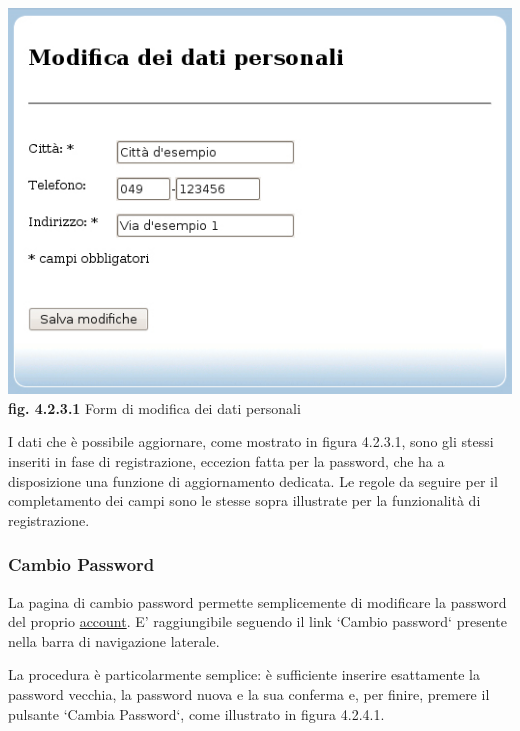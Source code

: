\documentclass[11pt,a4paper]{article}
\begin{document}
\begin{center}
	\includegraphics[scale=0.5]{images/dati_personali.jpg}\\ 
	\textbf{fig. 4.2.3.1} Form di modifica dei dati personali\\
\end{center}
\bigskip

I dati che è possibile aggiornare, come mostrato in figura 4.2.3.1, sono gli stessi inseriti in fase di registrazione, eccezion fatta per la password, che ha a disposizione una funzione di aggiornamento dedicata. Le regole da seguire per il completamento dei campi sono le stesse sopra illustrate per la funzionalità di registrazione.
\subsubsection{Cambio Password}
La pagina di cambio password permette semplicemente di modificare la password del proprio \underline{account}. E' raggiungibile seguendo il link `Cambio password` presente nella barra di navigazione laterale.

La procedura è particolarmente semplice: è sufficiente inserire esattamente la password vecchia, la password nuova e la sua conferma e, per finire, premere il pulsante `Cambia Password`, come illustrato in figura 4.2.4.1.
\end{document}
